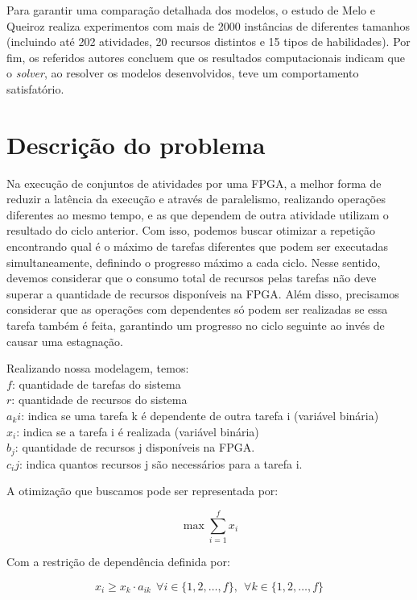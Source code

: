 \documentclass[journal]{IEEEtran}
\begin{document}
        Para garantir uma comparação detalhada dos modelos, o estudo de Melo e Queiroz realiza experimentos com mais de 2000 instâncias de diferentes tamanhos (incluindo até 202 atividades, 20 recursos distintos e 15 tipos de habilidades). Por fim, os referidos autores concluem que os resultados computacionais indicam que o \textit{solver}, ao resolver os modelos desenvolvidos, teve um comportamento satisfatório.

    \section{Descrição do problema}
        Na execução de conjuntos de atividades por uma FPGA, a melhor forma de reduzir a latência da execução e através de paralelismo, realizando operações diferentes ao mesmo tempo, e as que dependem de outra atividade utilizam o resultado do ciclo anterior. Com isso, podemos buscar otimizar a repetição encontrando qual é o máximo de tarefas diferentes que podem ser executadas simultaneamente, definindo o progresso máximo a cada ciclo.
        Nesse sentido, devemos considerar que o consumo total de recursos pelas tarefas não deve superar a quantidade de recursos disponíveis na FPGA. Além disso, precisamos considerar que as operações com dependentes só podem ser realizadas se essa tarefa também é feita, garantindo um progresso no ciclo seguinte ao invés de causar uma estagnação.

        Realizando nossa modelagem, temos:\\
        \( f \): quantidade de tarefas do sistema\\
        \( r \): quantidade de recursos do sistema\\
        \( a_ki \): indica se uma tarefa k é dependente de outra tarefa i (variável binária)\\
        \( x_i \): indica se a tarefa i é realizada (variável binária)\\
        \( b_j \): quantidade de recursos j disponíveis na FPGA.\\
        \( c_ij \): indica quantos recursos j são necessários para a tarefa i.
        
        A otimização que buscamos pode ser representada por:

        \[
        \max_{} \sum_{i=1}^{f} x_i 
        \]
        
        Com a restrição de dependência definida por:
        
        \[
        x_i \geq x_k \cdot a_{ik}~~\forall i \in \{1, 2, \ldots, f\},~~ \forall k \in \{1, 2, \ldots, f\}
        \]
\end{document}

